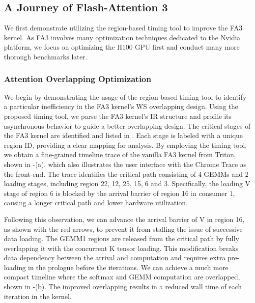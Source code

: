 \subsection{A Journey of Flash-Attention 3} \label{sec:use_case}





We first demonstrate utilizing the region-based timing tool to improve the FA3 kernel.
As FA3 involves many optimization techniques dedicated to the Nvidia platform, we focus on optimizing the H100 GPU first and conduct many more thorough benchmarks later.


\subsubsection{Attention Overlapping Optimization}

We begin by demonstrating the usage of the region-based timing tool to identify a particular inefficiency in the FA3 kernel's WS overlapping design. 
Using the proposed timing tool, we parse the FA3 kernel’s IR structure and profile its asynchronous behavior to guide a better overlapping design. 
The critical stages of the FA3 kernel are identified and listed in \Tbl{\ref{tbl:fa3}}. Each stage is labeled with a unique region ID, providing a clear mapping for analysis.
By employing the timing tool, we obtain a fine-grained timeline trace of the vanilla FA3 kernel from Triton, shown in \Fig{\ref{fig:fa3_trace}}-(a), which also illustrates the user interface with the Chrome Trace as the front-end.
The trace identifies the critical path consisting of 4 GEMMs and 2 loading stages, including region 22, 12, 25, 15, 6 and 3.
Specifically, the loading V stage of region 6 is blocked by the arrival barrier of region 16 in consumer 1, causing a longer critical path and lower hardware utilization.




Following this observation, we can advance the arrival barrier of V in region 16, as shown with the red arrows, to prevent it from stalling the issue of successive data loading.
The GEMM1 regions are released from the critical path by fully overlapping it with the concurrent K tensor loading.
This modification breaks data dependency between the arrival and computation and requires extra pre-loading in the prologue before the iterations.
We can achieve a much more compact timeline where the softmax and GEMM computation are overlapped, shown in \Fig{\ref{fig:fa3_trace}}-(b).
The improved overlapping results in a reduced wall time of each iteration in the kernel.

